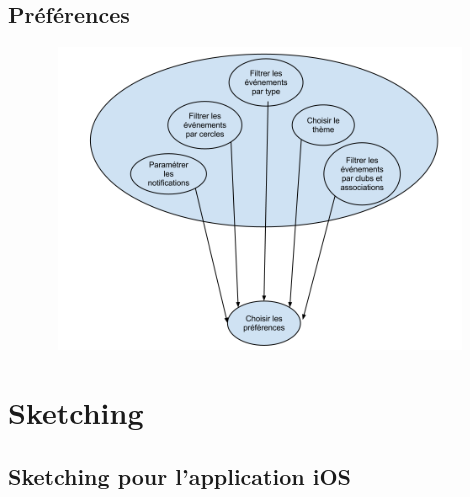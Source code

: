 \documentclass[a4paper, 11px]{article}
\begin{document}
\subsection{Préférences}
\begin{figure}[h!]
\includegraphics[width=18cm,height=8cm]{IUApreferences.png}
\end{figure}
\newpage

\section{Sketching}

\subsection{Sketching pour l'application iOS}
\end{document}

